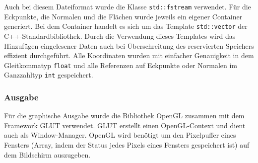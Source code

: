 \documentclass[crop=false]{standalone}
\begin{document}

        Auch bei diesem Dateiformat wurde die Klasse \texttt{std::fstream} verwendet.
        Für die Eckpunkte, die Normalen und die Flächen wurde jeweils ein eigener Container generiert.
        Bei dem Container handelt es sich um das Template \texttt{std::vector} der C++-Standardbibliothek.
        Durch die Verwendung dieses Templates wird das Hinzufügen eingelesener Daten auch bei Überschreitung des reservierten Speichers effizient durchgeführt.
        Alle Koordinaten wurden mit einfacher Genauigkeit in dem Gleitkommatyp \texttt{float} und alle Referenzen auf Eckpunkte oder Normalen im Ganzzahltyp \texttt{int} gespeichert.

      \subsubsection{Ausgabe} %
      \label{ssub:ausgabe}
        Für die graphische Ausgabe wurde die Bibliothek OpenGL zusammen mit dem Framework GLUT verwendet.
        GLUT erstellt einen OpenGL-Context und dient auch als Window-Manager.
        OpenGL wird benötigt um den Pixelpuffer eines Fensters (Array, indem der Status jedes Pixels eines Fensters gespeichert ist) auf dem Bildschirm auszugeben.
\end{document}

